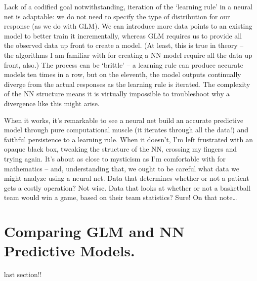 \documentclass[12pt]{article}
\begin{document}
Lack of a codified goal notwithstanding, iteration of the `learning rule' in a neural net is adaptable:  we do not need to specify the type of
distribution for our response (as we do with GLM).  We can introduce more data points to an existing model to better train it incrementally,
whereas GLM requires us to provide all the observed data up front to create a model.  (At least, this is true in theory -- the algorithms I am
familiar with for creating a NN model require all the data up front, also.)  The process can be `brittle' -- a learning rule can produce accurate
models ten times in a row, but on the eleventh, the model outputs continually diverge from the actual responses as the learning rule is iterated.  
The complexity of the NN structure means it is virtually impossible to troubleshoot why a divergence like this might arise.

When it works, it's remarkable to see a neural net build an accurate predictive model through pure computational muscle (it iterates through all
the data!) and faithful persistence to a learning rule.  When it doesn't, I'm left frustrated with an opaque black box, tweaking the structure
of the NN, crossing my fingers and trying again.  It's about as close to mysticism as I'm comfortable with for mathematics -- and, understanding
that, we ought to be careful what data we might analyze using a neural net.  Data that determines whether or not a patient gets a costly operation?
Not wise.  Data that looks at whether or not a basketball team would win a game, based on their team statistics?  Sure!  On that note\dots


\section{Comparing GLM and NN Predictive Models.}

last section!!
\end{document}

